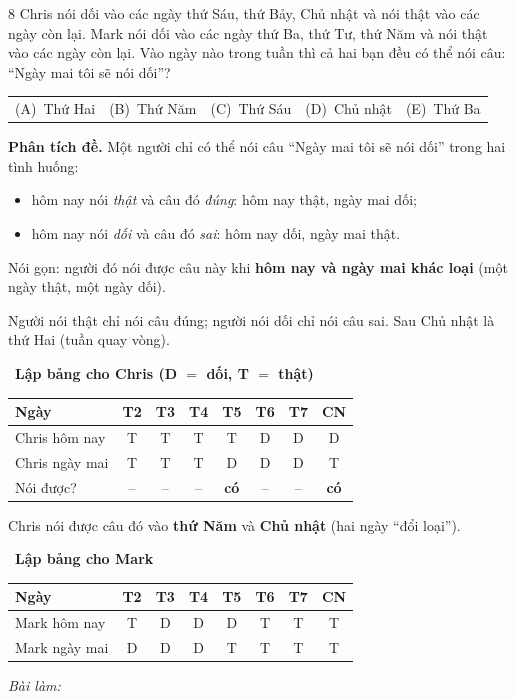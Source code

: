 \documentclass[11pt]{article}
\makeatletter
\newif\ifsol \solfalse
\newenvironment{probbox}[2]{\begin{probboxT}{#1}{#2}}{\end{probboxT}}
\newcommand{\StuProb}[2]{\begin{probboxS}{#1}{#2}\StuProbBody\end{probboxS}}
\newcommand{\probsol}[1]{%
  \begin{lrbox}{\solmeasure}\begin{minipage}{\dimexpr\linewidth-24pt\relax}#1\end{minipage}\end{lrbox}%
  \ifsol
    \begin{solbox}#1\end{solbox}%
  \else
    \setlength{\solht}{\dimexpr\ht\solmeasure+\dp\solmeasure+0.85cm\relax}%
    \ifdim\solht<1.35cm\setlength{\solht}{1.35cm}\fi
    \ifdim\solht>\StudentMaxWork\setlength{\solht}{\StudentMaxWork}\fi
    \par\noindent\begin{minipage}{\linewidth}%
    \expandafter\StuProb\StuProbArgs
    \begin{tcolorbox}[colback=white,colframe=Line,boxrule=0.8pt,arc=5pt,
      left=8pt,right=8pt,top=4pt,bottom=4pt,height=\solht]{\footnotesize\color{Slate}\itshape\WorkWord}\end{tcolorbox}%
    \end{minipage}\par\medskip
  \fi}
\newlength{\StudentMaxWork}\setlength{\StudentMaxWork}{4.5cm}
\newcommand{\step}[2]{\par\smallskip\noindent{\bfseries\color{tmBlue!85!black}\StepWord~#1.}\ {\bfseries #2}\par\nopagebreak}
\newcommand{\choices}[5]{\par\smallskip\noindent
  \begin{tabularx}{\linewidth}{@{}XXXXX@{}}(A)\ #1&(B)\ #2&(C)\ #3&(D)\ #4&(E)\ #5\end{tabularx}\par}
\def\WorkWord{Bài làm:}
\def\StepWord{Bước}
\makeatother
\begin{document}
\begin{probbox}{8}{\relax}
Chris nói dối vào các ngày thứ Sáu, thứ Bảy, Chủ nhật và nói thật vào các ngày còn lại. Mark nói dối vào các ngày thứ Ba, thứ Tư,
thứ Năm và nói thật vào các ngày còn lại. Vào ngày nào trong tuần thì cả hai bạn đều có thể nói câu: ``Ngày mai tôi sẽ nói dối''?
\choices{Thứ Hai}{Thứ Năm}{Thứ Sáu}{Chủ nhật}{Thứ Ba}
\end{probbox}
\probsol{
\textbf{Phân tích đề.} Một người chỉ có thể nói câu ``Ngày mai tôi sẽ nói dối'' trong hai tình huống:
\begin{itemize}[leftmargin=1.4em,itemsep=0pt,topsep=1pt]
\item hôm nay nói \emph{thật} và câu đó \emph{đúng}: hôm nay thật, ngày mai dối;
\item hôm nay nói \emph{dối} và câu đó \emph{sai}: hôm nay dối, ngày mai thật.
\end{itemize}
Nói gọn: người đó nói được câu này khi \textbf{hôm nay và ngày mai khác loại} (một ngày thật, một ngày dối).
\begin{recallbox}Người nói thật chỉ nói câu đúng; người nói dối chỉ nói câu sai. Sau Chủ nhật là thứ Hai (tuần quay vòng).\end{recallbox}
\step{1}{Lập bảng cho Chris (D $=$ dối, T $=$ thật)}
\begin{center}
\setlength{\tabcolsep}{4pt}
\begin{tabular}{|l|c|c|c|c|c|c|c|}
\hline
\rowcolor{tmBlue!10} Ngày & T2 & T3 & T4 & T5 & T6 & T7 & CN \\ \hline
Chris hôm nay & T & T & T & T & D & D & D \\ \hline
Chris ngày mai & T & T & T & D & D & D & T \\ \hline
Nói được? & -- & -- & -- & \textbf{có} & -- & -- & \textbf{có} \\ \hline
\end{tabular}
\end{center}
Chris nói được câu đó vào \textbf{thứ Năm} và \textbf{Chủ nhật} (hai ngày ``đổi loại'').
\step{2}{Lập bảng cho Mark}
\begin{center}
\setlength{\tabcolsep}{4pt}
\begin{tabular}{|l|c|c|c|c|c|c|c|}
\hline
\rowcolor{tmBlue!10} Ngày & T2 & T3 & T4 & T5 & T6 & T7 & CN \\ \hline
Mark hôm nay & T & D & D & D & T & T & T \\ \hline
Mark ngày mai & D & D & D & T & T & T & T \\ \hline

\end{tabular}
\end{center}}
\end{document}
